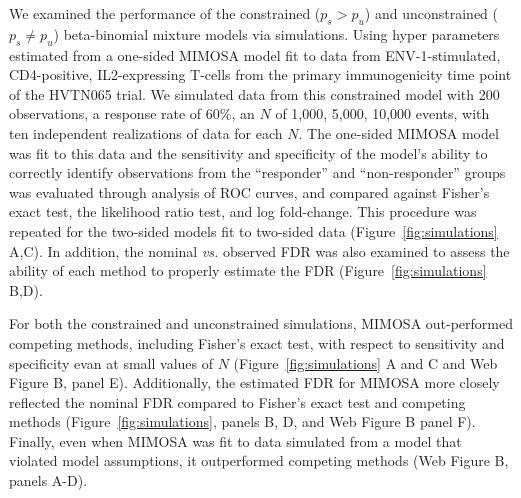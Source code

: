 \documentclass[useAMS,referee,usenatbib]{biom}
\begin{document}
We examined the performance of the constrained ($p_s>p_u$) and unconstrained ($p_s \ne p_u$) beta-binomial mixture models via simulations. Using hyper parameters estimated from a one-sided MIMOSA model fit to data from ENV-1-stimulated, CD4-positive, IL2-expressing T-cells from the primary immunogenicity time point of the HVTN065 trial. We simulated data from this constrained model with 200 observations, a response rate of 60\%, an $N$ of 1,000, 5,000, 10,000 events, with ten independent realizations of data for each $N$. The one-sided MIMOSA model was fit to this data and the sensitivity and specificity of the model's ability to correctly identify observations from the ``responder'' and ``non-responder'' groups was evaluated through analysis of ROC curves, and compared against Fisher's exact test, the likelihood ratio test, and log fold-change. This procedure was repeated for the two-sided models fit to two-sided data (Figure~\ref{fig:simulations} A,C). In addition, the nominal \textit{vs.} observed FDR was also examined to assess the ability of each method to properly estimate the FDR (Figure~\ref{fig:simulations} B,D). 

For both the constrained and unconstrained simulations, MIMOSA out-performed competing methods, including Fisher's exact test, with respect to sensitivity and specificity evan at small values of $N$ (Figure~\ref{fig:simulations} A and C and Web Figure B, panel E). Additionally, the estimated FDR for MIMOSA more closely reflected the nominal FDR compared to Fisher's exact test and competing methods (Figure~\ref{fig:simulations}, panels B, D, and Web Figure B panel F). Finally, even when MIMOSA was fit to data simulated from a model that violated model assumptions, it outperformed competing methods (Web Figure B, panels A-D).
\end{document}
